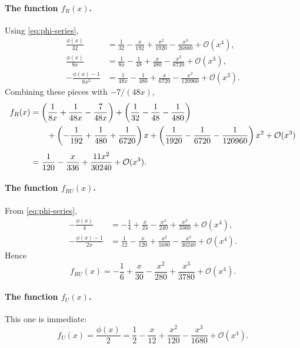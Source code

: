 \documentclass[11pt,a4paper]{article}
\theoremstyle{definition}
\theoremstyle{remark}
\begin{document}
\paragraph{The function $f_R(x)$.}
Using \eqref{eq:phi-series},
\begin{align}
  \frac{\phi(x)}{32}
  &= \frac{1}{32}
   - \frac{x}{192}
   + \frac{x^2}{1920}
   - \frac{x^3}{26880}
   + \mathcal O(x^4),
  \label{eq:phi-over-32}\\[4pt]
  \frac{\phi(x)}{8x}
  &= \frac{1}{8x}
   - \frac{1}{48}
   + \frac{x}{480}
   - \frac{x^2}{6720}
   + \mathcal O(x^3),
  \label{eq:phi-over-8x}\\[4pt]
  -\frac{\phi(x)-1}{8x^2}
  &= \frac{1}{48x}
   - \frac{1}{480}
   + \frac{x}{6720}
   - \frac{x^2}{120960}
   + \mathcal O(x^3).
  \label{eq:phi-minus-1}
\end{align}
Combining these pieces with $-7/(48x)$,
\begin{align}
  f_R(x)
  &= \left(\frac{1}{8x} + \frac{1}{48x} - \frac{7}{48x}\right)
   + \left(\frac{1}{32} - \frac{1}{48} - \frac{1}{480}\right)
  \notag\\
  &\qquad
   + \left(-\frac{1}{192} + \frac{1}{480} + \frac{1}{6720}\right)x
   + \left(\frac{1}{1920} - \frac{1}{6720} - \frac{1}{120960}\right)x^2
   + \mathcal O(x^3)
  \notag\\[4pt]
  &= \frac{1}{120}
   - \frac{x}{336}
   + \frac{11x^2}{30240}
   + \mathcal O(x^3).
  \label{eq:fR-series}
\end{align}

\paragraph{The function $f_{RU}(x)$.}
From \eqref{eq:phi-series},
\begin{align}
  -\frac{\phi(x)}{4}
  &= -\frac{1}{4}
   + \frac{x}{24}
   - \frac{x^2}{240}
   + \frac{x^3}{3360}
   + \mathcal O(x^4),
  \label{eq:minus-phi-over-4}\\[4pt]
  -\frac{\phi(x)-1}{2x}
  &= \frac{1}{12}
   - \frac{x}{120}
   + \frac{x^2}{1680}
   - \frac{x^3}{30240}
   + \mathcal O(x^4).
  \label{eq:phi-1-over-2x}
\end{align}
Hence
\begin{equation}
  f_{RU}(x)
  = -\frac{1}{6}
  + \frac{x}{30}
  - \frac{x^2}{280}
  + \frac{x^3}{3780}
  + \mathcal O(x^4).
  \label{eq:fRU-series}
\end{equation}

\paragraph{The function $f_U(x)$.}
This one is immediate:
\begin{equation}
  f_U(x)
  = \frac{\phi(x)}{2}
  = \frac{1}{2}
  - \frac{x}{12}
  + \frac{x^2}{120}
  - \frac{x^3}{1680}
  + \mathcal O(x^4).
  \label{eq:fU-series}
\end{equation}
\end{document}
